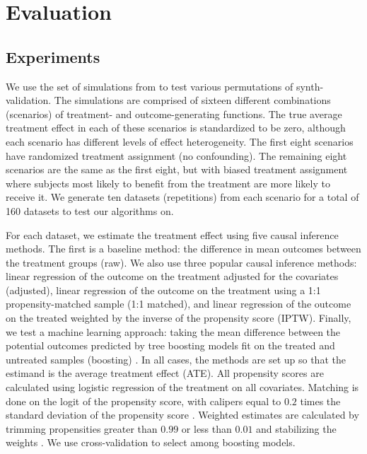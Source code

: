 \section{Evaluation}
\label{sec:eval}

\subsection{Experiments}

We use the set of simulations from \citet{Powers:2017wd} to test various permutations of synth-validation. The simulations are comprised of sixteen different combinations (scenarios) of treatment- and outcome-generating functions. The true average treatment effect in each of these scenarios is standardized to be zero, although each scenario has different levels of effect heterogeneity. The first eight scenarios have randomized treatment assignment (no confounding). The remaining eight scenarios are the same as the first eight, but with biased treatment assignment where subjects most likely to benefit from the treatment are more likely to receive it. We generate ten datasets (repetitions) from each scenario for a total of 160 datasets to test our algorithms on. 

For each dataset, we estimate the treatment effect using five causal inference methods. The first is a baseline method: the difference in mean outcomes between the treatment groups (raw). We also use three popular causal inference methods: linear regression of the outcome on the treatment adjusted for the covariates (adjusted), linear regression of the outcome on the treatment using a 1:1 propensity-matched sample (1:1 matched), and linear regression of the outcome on the treated weighted by the inverse of the propensity score (IPTW). Finally, we test a machine learning approach: taking the mean difference between the potential outcomes predicted by tree boosting models fit on the treated and untreated samples (boosting) \cite{Austin:2012cy}. In all cases, the methods are set up so that the estimand is the average treatment effect (ATE). All propensity scores are calculated using logistic regression of the treatment on all covariates. Matching is done on the logit of the propensity score, with calipers equal to $0.2$ times the standard deviation of the propensity score \cite{Austin:2011dc}. Weighted estimates are calculated by trimming propensities greater than $0.99$ or less than $0.01$ and stabilizing the weights \cite{Sturmer:2014kr}. We use cross-validation to select among boosting models. 

